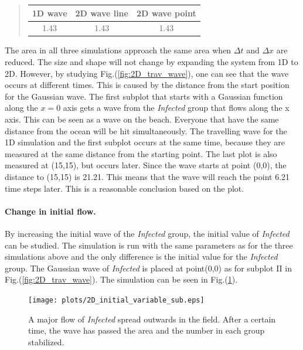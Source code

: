 \documentclass[%
twoside,                 %
final,                   %
10pt]{article}
\begin{document}
\label{table:wave_values}

\begin{quote}
\begin{tabular}{ccc}
\hline
\multicolumn{1}{c}{ 1D wave } & \multicolumn{1}{c}{ 2D wave line } & \multicolumn{1}{c}{ 2D wave point } \\
\hline
1.43    & 1.43         & 1.43          \\
\hline
\end{tabular}
\end{quote}

\noindent
The area in all three simulations approach the same area when $\Delta t$ and $\Delta x$ are reduced. The size and shape will not change by  expanding the system from 1D to 2D. However, by studying Fig.(\ref{fig:2D_trav_wave}), one can see that the wave occurs at different times. This is caused by the distance from the start position for the Gaussian wave. The first subplot that starts with a Gaussian function along the $x=0$ axis gets a wave from the \emph{Infected} group that flows along the x axis. This can be seen as a wave on the beach. Everyone that have the same distance from the ocean will be hit simultaneously. The travelling wave for the 1D simulation and the first subplot occurs at the same time, because they are measured at the same distance from the starting point. The last plot is also measured at (15,15), but occurs later. Since the wave starts at point (0,0), the distance to (15,15) is 21.21. This means that the wave will reach the point 6.21 time steps later. This is a reasonable conclusion based on the plot.    

\paragraph{Change in initial flow.}
By increasing the initial wave of the \emph{Infected} group, the initial value of \emph{Infected} can be studied. The simulation is run with the same parameters as for the three simulations above and the only difference is the initial value for the \emph{Infected} group. The Gaussian wave of \emph{Infected} is placed at point(0,0) as for subplot II in Fig.(\ref{fig:2D_trav_wave}). The simulation can be seen in Fig.(\ref{fig:initial_value}).  


\begin{figure}[ht]
  \centerline{\texttt{[image: plots/2D\_initial\_variable\_sub.eps]}}
  \caption{
  \label{fig:initial_value} A major flow of \emph{Infected} spread outwards in the field. After a certain time, the wave has passed the area and the number in each group stabilized.
  }
\end{figure}
\end{document}
